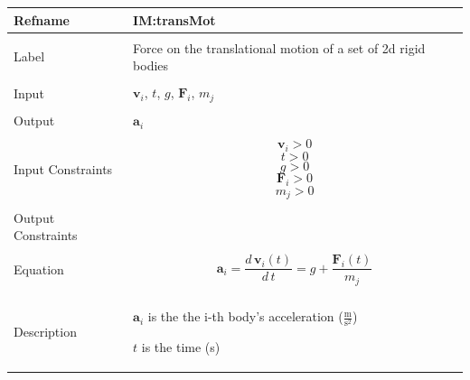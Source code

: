 \documentclass[12pt]{article}
\begin{document}
\noindent \begin{minipage}{\textwidth}
\begin{tabular}{p{} p{}}
\toprule \textbf{Refname} & \textbf{IM:transMot}
\label{IM:transMot}
\\ \midrule \\
Label & Force on the translational motion of a set of 2d rigid bodies
\\ \midrule \\
Input & ${\mathbf{v}_{i}}$, $t$, $g$, ${\mathbf{F}_{i}}$, ${m_{j}}$
\\ \midrule \\
Output & ${\mathbf{a}_{i}}$
\\ \midrule \\
Input Constraints & \begin{displaymath}
                    {\mathbf{v}_{i}}>0
                    \end{displaymath}
                    \begin{displaymath}
                    t>0
                    \end{displaymath}
                    \begin{displaymath}
                    g>0
                    \end{displaymath}
                    \begin{displaymath}
                    {\mathbf{F}_{i}}>0
                    \end{displaymath}
                    \begin{displaymath}
                    {m_{j}}>0
                    \end{displaymath}
\\ \midrule \\
Output Constraints & 
\\ \midrule \\
Equation & \begin{displaymath}
           {\mathbf{a}_{i}}=\frac{d\,{\mathbf{v}_{i}}\left(t\right)}{d\,t}=g+\frac{{\mathbf{F}_{i}}\left(t\right)}{{m_{j}}}
           \end{displaymath}
\\ \midrule \\
Description & \begin{symbDescription}
              \item{${\mathbf{a}_{i}}$ is the the i-th body's acceleration ($\frac{\text{m}}{\text{s}^{2}}$)}
              \item{$t$ is the time (s)}

\end{symbDescription}
\end{tabular}
\end{minipage}
\end{document}
